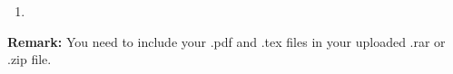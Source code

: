 \documentclass[12pt,a4paper]{article}
\makeatletter
\newtheorem*{solution}{Solution}
\theoremstyle{definition}
\renewenvironment{solution}[1][Solution] {\par\pushQED{\qed}\normalfont\topsep6\p@\@plus6\p@\relax\trivlist\item[\hskip\labelsep\bfseries#1\@addpunct{.}]\ignorespaces}{\popQED\endtrivlist\@endpefalse} \makeatother
\makeatother
\begin{document}
\begin{enumerate}
\begin{solution}
\end{solution}


\end{enumerate}

\vspace{20pt}

\textbf{Remark:} You need to include your .pdf and .tex files in your uploaded .rar or .zip file.

\end{document}
